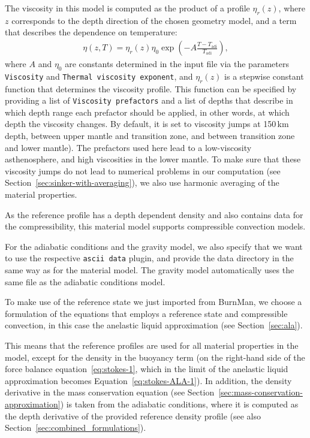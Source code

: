 \documentclass{article}
\begin{document}
The viscosity in this model is computed as the product of a profile $\eta_r(z)$, where $z$ corresponds to the depth direction of the chosen geometry model, and a 
term that describes the dependence on temperature:
\begin{align*}
\eta(z,T) = \eta_r(z) \eta_0 \exp\left(-A \frac{T - T_{\text{adi}}}{T_{\text{adi}}}\right),
\end{align*}
where $A$ and $\eta_0$ are constants determined in the input file via the parameters 
\texttt{Viscosity} and \texttt{Thermal viscosity exponent}, and $\eta_r(z)$ is a stepwise constant 
function that determines the viscosity profile. This function can be specified by providing a list of 
\texttt{Viscosity prefactors} and a list of depths that describe in which depth range each prefactor 
should be applied, in other words, at which depth the viscosity changes. By default, it is set
to viscosity jumps at 150\,km depth, between upper mantle and transition zone, 
and between transition zone and lower mantle). The prefactors used here lead to a low-viscosity 
asthenosphere, and high viscosities in the lower mantle. To make sure that these viscosity jumps 
do not lead to numerical problems in our computation (see Section~\ref{sec:sinker-with-averaging}), 
we also use harmonic averaging of the material properties.

As the reference profile has a depth dependent density and also contains data for the compressibility, 
this material model supports compressible convection models. 

For the adiabatic conditions and the gravity model, we also specify that we want to use the respective
\texttt{ascii data} plugin, and provide the data directory in the same way as for the material 
model. The gravity model automatically uses the same file as the adiabatic conditions model.



To make use of the reference state we just imported from BurnMan, we choose a formulation of the 
equations that employs a reference state and compressible convection, in this case the anelastic 
liquid approximation (see Section~\ref{sec:ala}). 

This means that the reference profiles are used for all material properties in the model, except for
the density in the buoyancy term (on the right-hand side of the force balance equation~\eqref{eq:stokes-1}, 
which in the limit of the anelastic liquid approximation becomes Equation~\eqref{eq:stokes-ALA-1}). 
In addition, the density derivative in the mass conservation equation 
(see Section~\ref{sec:mass-conservation-approximation}) is taken from the adiabatic 
conditions, where it is computed as the depth derivative of the provided reference density profile
(see also Section~\ref{sec:combined_formulations}).
\end{document}
